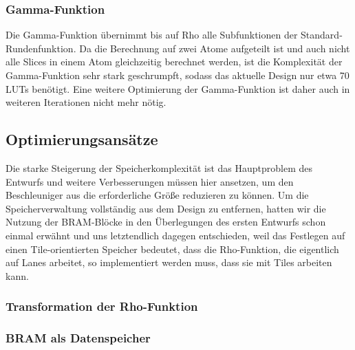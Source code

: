\subsubsection{Gamma-Funktion}
Die Gamma-Funktion übernimmt bis auf Rho alle Subfunktionen der Standard-Rundenfunktion. Da die Berechnung auf zwei Atome aufgeteilt ist und auch nicht alle Slices in einem Atom gleichzeitig berechnet werden,
ist die Komplexität der Gamma-Funktion sehr stark geschrumpft, sodass das aktuelle Design nur etwa 70 LUTs benötigt. Eine weitere Optimierung der Gamma-Funktion ist daher auch in weiteren Iterationen nicht mehr nötig.

\subsection{Optimierungsansätze}
Die starke Steigerung der Speicherkomplexität ist das Hauptproblem des Entwurfs und weitere Verbesserungen müssen hier ansetzen, um den Beschleuniger aus die erforderliche Größe reduzieren zu können.
Um die Speicherverwaltung vollständig aus dem Design zu entfernen, hatten wir die Nutzung der BRAM-Blöcke in den Überlegungen des ersten Entwurfs schon einmal erwähnt und uns letztendlich dagegen entschieden,
weil das Festlegen auf einen Tile-orientierten Speicher bedeutet, dass die Rho-Funktion, die eigentlich auf Lanes arbeitet, so implementiert werden muss, dass sie mit Tiles arbeiten kann.
\subsubsection{Transformation der Rho-Funktion}


\subsubsection{BRAM als Datenspeicher}
